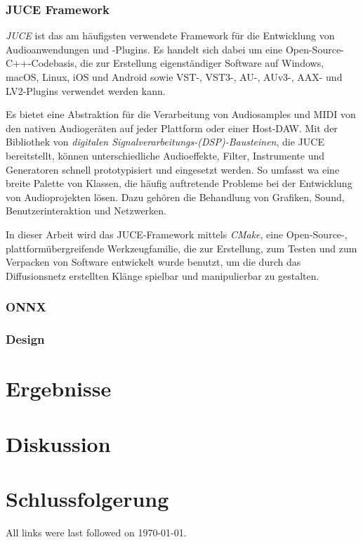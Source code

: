 \documentclass[
  a4paper,  %
  twoside,  %
  bibliography=totoc,
  headsepline,
  cleardoublepage=empty,
  parskip=half,
  draft=false
]{scrbook}
\begin{document}
\subsection{JUCE Framework}
\glqq\emph{JUCE} ist das am häufigsten verwendete Framework für die Entwicklung von Audioanwendungen und -Plugins. Es handelt sich dabei um eine Open-Source-C++-Codebasis, die zur Erstellung eigenständiger Software auf Windows, macOS, Linux, iOS und Android sowie VST-, VST3-, AU-, AUv3-, AAX- und LV2-Plugins verwendet werden kann.\grqq \cite{noauthor_juce_nodate}

Es bietet eine Abstraktion für die Verarbeitung von Audiosamples und MIDI von den nativen Audiogeräten auf jeder Plattform oder einer Host-DAW. Mit der Bibliothek von \emph{digitalen Signalverarbeitungs-(DSP)-Bausteinen}, die JUCE bereitstellt, können unterschiedliche Audioeffekte, Filter, Instrumente und Generatoren schnell prototypisiert und eingesetzt werden. \cite{noauthor_juce_nodate} So umfasst wa eine breite Palette von Klassen, die häufig auftretende Probleme bei der Entwicklung von Audioprojekten lösen. Dazu gehören die Behandlung von Grafiken, Sound, Benutzerinteraktion und Netzwerken. \cite{robinson_getting_2013}

In dieser Arbeit wird das JUCE-Framework mittels \emph{CMake}, \glqq eine Open-Source-, plattformübergreifende Werkzeugfamilie, die zur Erstellung, zum Testen und zum Verpacken von Software entwickelt wurde\grqq \cite{noauthor_cmake_nodate} benutzt, um die durch das Diffusionsnetz erstellten Klänge spielbar und manipulierbar zu gestalten. 
\subsection{ONNX}
\subsection{Design}

\chapter{Ergebnisse}

\chapter{Diskussion}

\chapter{Schlussfolgerung}
\label{sec:conclusion}


\printbibliography

All links were last followed on \today{}.

\appendix


\pagestyle{empty}
\renewcommand*{\chapterpagestyle}{empty}
\Affirmation
\end{document}
